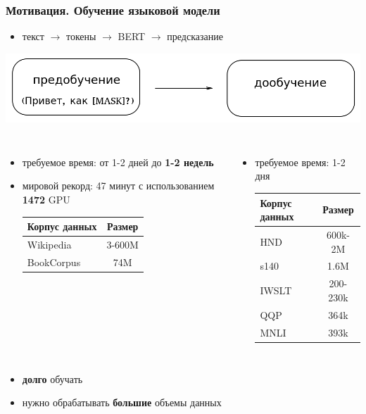 \documentclass{beamer}
\begin{document}
\begin{frame}
	\frametitle{Мотивация. Обучение языковой модели}
	\begin{itemize}
		\item текст $\rightarrow$ токены $\rightarrow$ BERT $\rightarrow$ предсказание
	\end{itemize}
	\includegraphics[scale=0.4]{pre_training_fine_tuning.png}
	\begin{columns}
			\begin{itemize}
				\item требуемое время: от 1-2 дней до {\bf 1-2 недель}
				\item мировой рекорд: 47 минут с использованием {\bf 1472} GPU

				\begin{table}
					\begin{tabular}{l|c}
						Корпус данных & Размер \\
						\hline\hline
						Wikipedia & 3-600M \\
						BookCorpus & 74M\\
					\end{tabular}
				\end{table}
			\end{itemize}
			\begin{itemize}
				\item требуемое время: 1-2 дня

				\begin{table}
					\begin{tabular}{l|c}
						Корпус данных & Размер \\
						\hline\hline
						HND & 600k-2M \\
						s140 & 1.6M \\
						IWSLT & 200-230k \\
						QQP & 364k \\
						MNLI & 393k \\
					\end{tabular}
				\end{table}
			\end{itemize}
	\end{columns}
	\noindent\makebox[\linewidth]{\rule{\paperwidth}{0.4pt}}
	\begin{itemize}
		\item {\bf долго} обучать
		\item нужно обрабатывать {\bf большие} объемы данных
	\end{itemize}
\end{frame}
\end{document}
